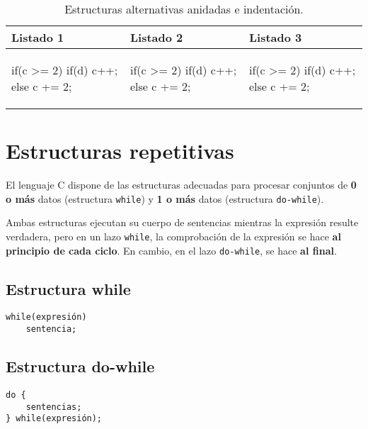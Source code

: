\begin{table}
\centering
\begin{tabular}{l|l|l}
Listado 1 & Listado 2 & Listado 3\\
\hline
\begin{codecell}
if(c >= 2) {
    if(d)
        c++;
} else
    c += 2;
\end{codecell}
&
\begin{codecell}
if(c >= 2) 
    if(d)
        c++;
else
    c += 2;
\end{codecell}
&
\begin{codecell}
if(c >= 2) { 
    if(d)
        c++;
	else
    	c += 2;
}
\end{codecell}\\
\end{tabular}
\caption{Estructuras alternativas anidadas e indentación.}
\label{tab:indent}
\end{table}



\section{Estructuras repetitivas}

El lenguaje C dispone de las estructuras adecuadas para procesar conjuntos de \textbf{0 o más}
datos (estructura \lstinline{while}) y \textbf{1 o más} datos (estructura \lstinline{do-while}).

Ambas estructuras ejecutan su cuerpo de sentencias mientras la expresión
resulte verdadera, pero en un lazo \lstinline{while}, la comprobación de la expresión se hace \textbf{al principio de cada
ciclo}. En cambio, en el lazo \lstinline{do-while}, se hace \textbf{al final}.


\subsection{Estructura while}
\begin{lstlisting}
while(expresión)
    sentencia;
\end{lstlisting}

\subsection{Estructura do-while}
\begin{lstlisting}
do {
    sentencias;
} while(expresión);
\end{lstlisting}


